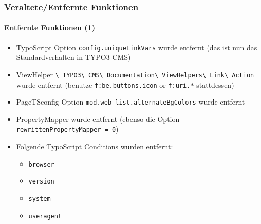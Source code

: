 
\begin{frame}[fragile]
	\frametitle{Veraltete/Entfernte Funktionen}
	\framesubtitle{Entfernte Funktionen (1)}

	\begin{itemize}

		\item
			\small
				TypoScript Option \texttt{config.uniqueLinkVars} wurde entfernt\newline
				(das ist nun das Standardverhalten in TYPO3 CMS)
			\normalsize

		\item
			\small
				ViewHelper
					\texttt{\textbackslash
						TYPO3\textbackslash
						CMS\textbackslash
						Documentation\textbackslash
						ViewHelpers\textbackslash
						Link\textbackslash
						Action}
					wurde entfernt (benutze \texttt{f:be.buttons.icon} or \texttt{f:uri.*} stattdessen)
			\normalsize

		\item
			\small
				PageTSconfig Option \texttt{mod.web\_list.alternateBgColors}\newline
				wurde entfernt
			\normalsize

		\item
			\small
				PropertyMapper wurde entfernt\newline
				(ebenso die Option \texttt{rewrittenPropertyMapper = 0})
			\normalsize

		\item
			\small
				Folgende TypoScript Conditions wurden entfernt:

					\begin{itemize}
						\item\texttt{browser}
						\item\texttt{version}
						\item\texttt{system}
						\item\texttt{useragent}
					\end{itemize}
			\normalsize

	\end{itemize}

\end{frame}

